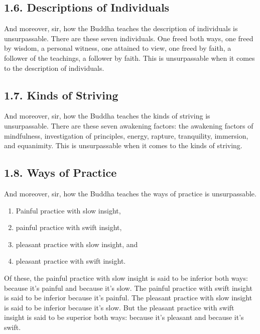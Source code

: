 \documentclass[12pt,openany]{book}%
\begin{document}
\subsection*{1.6. Descriptions of Individuals }

And moreover, sir, how the Buddha teaches the description of individuals is unsurpassable. There are these seven individuals. One freed both ways, one freed by wisdom, a personal witness, one attained to view, one freed by faith, a follower of the teachings, a follower by faith. This is unsurpassable when it comes to the description of individuals. 

\subsection*{1.7. Kinds of Striving }

And moreover, sir, how the Buddha teaches the kinds of striving is unsurpassable. There are these seven awakening factors: the awakening factors of mindfulness, investigation of principles, energy, rapture, tranquility, immersion, and equanimity. This is unsurpassable when it comes to the kinds of striving. 

\subsection*{1.8. Ways of Practice }

And moreover, sir, how the Buddha teaches the ways of practice is unsurpassable. 

\begin{enumerate}%
\item Painful practice with slow insight, %
\item painful practice with swift insight, %
\item pleasant practice with slow insight, and %
\item pleasant practice with swift insight. %
\end{enumerate}

Of these, the painful practice with slow insight is said to be inferior both ways: because it’s painful and because it’s slow. The painful practice with swift insight is said to be inferior because it’s painful. The pleasant practice with slow insight is said to be inferior because it’s slow. But the pleasant practice with swift insight is said to be superior both ways: because it’s pleasant and because it’s swift. 
\end{document}
